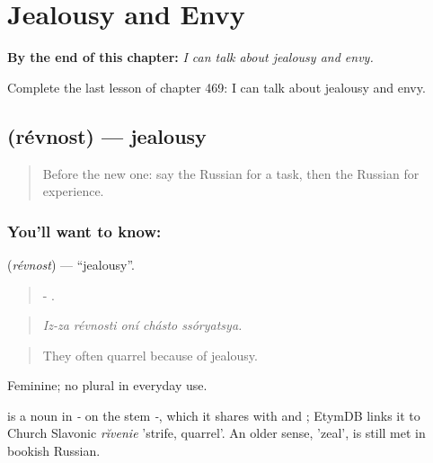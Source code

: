
\chapter{Jealousy and Envy}
\label{ch:ru-jealousy-and-envy}

\begin{chapteropening}
\textbf{By the end of this chapter:} \emph{I can talk about jealousy and envy.}

Complete the last lesson of chapter 469: I can talk about jealousy and envy.
\end{chapteropening}

\section[\texorpdfstring{\ru{ревность} (révnost)}{ревность (révnost)}]{ (révnost) — jealousy}

\label{lesson:RU-C469-revnost}



\begin{quote}
Before the new one: say the Russian for a task, then the Russian for experience.
\end{quote}

\subsection*{You'll want to know: }
\textbf{} (\emph{révnost}) — \textquotedblleft{}jealousy\textquotedblright{}.

\begin{quote}
-    .
\end{quote}

\begin{quote}
\emph{Iz-za révnosti oní chásto ssóryatsya.}
\end{quote}

\begin{quote}
They often quarrel because of jealousy.
\end{quote}

Feminine; no plural in everyday use.

\begin{cousinweb}
\emph{} is a noun in \emph{-} on the stem \emph{-}, which it shares with \emph{} and \emph{}; EtymDB links it to Church Slavonic \emph{rĭvenie} 'strife, quarrel'. An older sense, 'zeal', is still met in bookish Russian.
\end{cousinweb}

